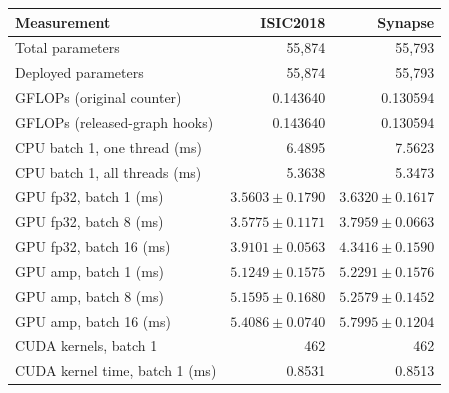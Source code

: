 \begin{tabular}{lrr}
\toprule
Measurement & ISIC2018 & Synapse \\
\midrule
Total parameters & 55,874 & 55,793 \\
Deployed parameters & 55,874 & 55,793 \\
GFLOPs (original counter) & 0.143640 & 0.130594 \\
GFLOPs (released-graph hooks) & 0.143640 & 0.130594 \\
CPU batch 1, one thread (ms) & 6.4895 & 7.5623 \\
CPU batch 1, all threads (ms) & 5.3638 & 5.3473 \\
GPU fp32, batch 1 (ms) & $3.5603 \pm 0.1790$ & $3.6320 \pm 0.1617$ \\
GPU fp32, batch 8 (ms) & $3.5775 \pm 0.1171$ & $3.7959 \pm 0.0663$ \\
GPU fp32, batch 16 (ms) & $3.9101 \pm 0.0563$ & $4.3416 \pm 0.1590$ \\
GPU amp, batch 1 (ms) & $5.1249 \pm 0.1575$ & $5.2291 \pm 0.1576$ \\
GPU amp, batch 8 (ms) & $5.1595 \pm 0.1680$ & $5.2579 \pm 0.1452$ \\
GPU amp, batch 16 (ms) & $5.4086 \pm 0.0740$ & $5.7995 \pm 0.1204$ \\
CUDA kernels, batch 1 & 462 & 462 \\
CUDA kernel time, batch 1 (ms) & 0.8531 & 0.8513 \\
\bottomrule
\end{tabular}
